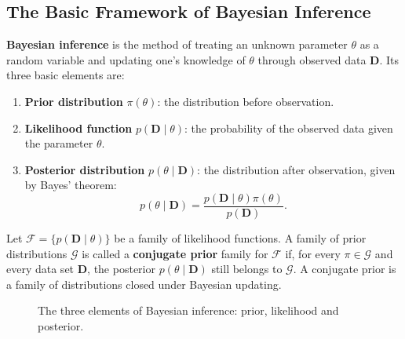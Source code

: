 \subsection{The Basic Framework of Bayesian Inference}
\label{subsec:bayes_framework}

\begin{definition}\label{def:bayesian_inference}
\textbf{Bayesian inference} is the method of treating an unknown parameter $\theta$ as a random variable and updating one's knowledge of $\theta$ through observed data $\mathbf{D}$. Its three basic elements are:
\begin{enumerate}[label=(\roman*)]
    \item \textbf{Prior distribution} $\pi(\theta)$: the distribution before observation.
    \item \textbf{Likelihood function} $p(\mathbf{D} \mid \theta)$: the probability of the observed data given the parameter $\theta$.
    \item \textbf{Posterior distribution} $p(\theta \mid \mathbf{D})$: the distribution after observation, given by Bayes' theorem:
    \[
    p(\theta \mid \mathbf{D}) = \frac{p(\mathbf{D} \mid \theta) \pi(\theta)}{p(\mathbf{D})}.
    \]
\end{enumerate}
\end{definition}

\begin{definition}\label{def:conjugate_prior}
Let $\mathcal{F} = \{p(\mathbf{D} \mid \theta)\}$ be a family of likelihood functions. A family of prior distributions $\mathcal{G}$ is called a \textbf{conjugate prior} family for $\mathcal{F}$ if, for every $\pi \in \mathcal{G}$ and every data set $\mathbf{D}$, the posterior $p(\theta \mid \mathbf{D})$ still belongs to $\mathcal{G}$. A conjugate prior is a family of distributions closed under Bayesian updating.
\end{definition}

\begin{figure}[htbp]
\centering
{}
\caption{The three elements of Bayesian inference: prior, likelihood and posterior.}
\label{fig:bayes_framework}
\end{figure}

